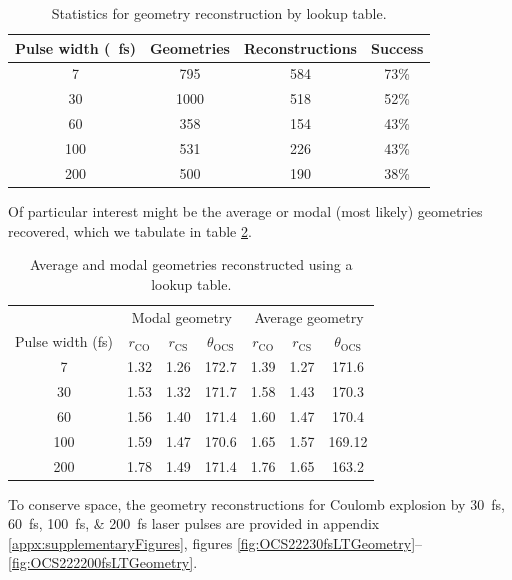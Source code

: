 \begin{table}
  \myfloatalign
  \centering
  \begin{tabularx}{0.875\textwidth}{cccc}
    \toprule
    Pulse width (\SI{}{\fs}) & Geometries & Reconstructions & Success \\
    \midrule
    7 & 795 & 584 & 73\% \\
    30 & 1000 & 518 & 52\% \\
    60 & 358 & 154 & 43\% \\
    100 & 531 & 226 & 43\% \\
    200 & 500 & 190 & 38\% \\
    \bottomrule
  \end{tabularx}
  \caption[Statistics for geometry reconstruction by lookup table.]
  {Statistics for geometry reconstruction by lookup table.}
  \label{table:lookupTableSuccess}
\end{table}

Of particular interest might be the average or modal (most likely) geometries recovered, which we tabulate in table \ref{table:lookupTableGeometries}.

\begin{table}
  \myfloatalign
  \centering
  \begin{tabularx}{0.9\textwidth}{ccccccc}
    \toprule
    & \multicolumn{3}{c}{Modal geometry} & \multicolumn{3}{c}{Average geometry} \\
    Pulse width (fs) & $r_\mathrm{CO}$ & $r_\mathrm{CS}$ & $\theta_\mathrm{OCS}$ & $r_\mathrm{CO}$ & $r_\mathrm{CS}$ & $\theta_\mathrm{OCS}$ \\
    \midrule
    7 & 1.32 & 1.26 & 172.7 & 1.39 & 1.27 & 171.6 \\
    30 & 1.53 & 1.32 & 171.7 & 1.58 & 1.43 & 170.3 \\
    60 & 1.56 & 1.40 & 171.4 & 1.60 & 1.47 & 170.4 \\
    100 & 1.59 & 1.47 & 170.6 & 1.65 & 1.57 & 169.12 \\
    200 & 1.78 & 1.49 & 171.4 & 1.76 & 1.65 & 163.2 \\
    \bottomrule
  \end{tabularx}
  \caption[Average and modal geometries reconstructed using a lookup table.]
  {Average and modal geometries reconstructed using a lookup table.}
  \label{table:lookupTableGeometries}
\end{table}

To conserve space, the geometry reconstructions for Coulomb explosion by \SIlist{30;60;100;200}{\fs} laser pulses are provided in appendix \ref{appx:supplementaryFigures}, figures \ref{fig:OCS22230fsLTGeometry}--\ref{fig:OCS222200fsLTGeometry}.

